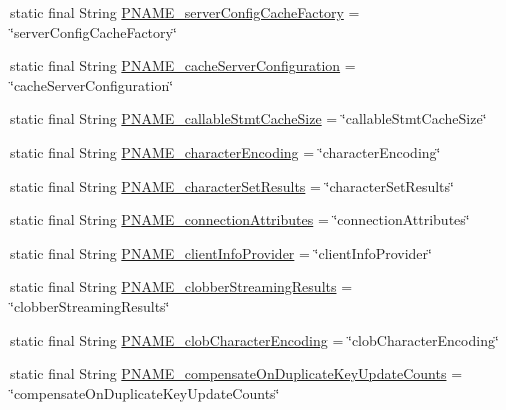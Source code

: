 \begin{DoxyCompactItemize}
\item 
static final String \mbox{\hyperlink{classcom_1_1mysql_1_1cj_1_1conf_1_1_property_definitions_abdde517ac3034e4ca1d6a8c1d4f5b247}{P\+N\+A\+M\+E\+\_\+server\+Config\+Cache\+Factory}} = \char`\"{}server\+Config\+Cache\+Factory\char`\"{}
\item 
static final String \mbox{\hyperlink{classcom_1_1mysql_1_1cj_1_1conf_1_1_property_definitions_ad55cd0e317a487dfdcac399fb3d946eb}{P\+N\+A\+M\+E\+\_\+cache\+Server\+Configuration}} = \char`\"{}cache\+Server\+Configuration\char`\"{}
\item 
static final String \mbox{\hyperlink{classcom_1_1mysql_1_1cj_1_1conf_1_1_property_definitions_a367a64bd823345bf89867ecc93e72695}{P\+N\+A\+M\+E\+\_\+callable\+Stmt\+Cache\+Size}} = \char`\"{}callable\+Stmt\+Cache\+Size\char`\"{}
\item 
static final String \mbox{\hyperlink{classcom_1_1mysql_1_1cj_1_1conf_1_1_property_definitions_a489a6767f196f3cae0dda8e14441ed0a}{P\+N\+A\+M\+E\+\_\+character\+Encoding}} = \char`\"{}character\+Encoding\char`\"{}
\item 
static final String \mbox{\hyperlink{classcom_1_1mysql_1_1cj_1_1conf_1_1_property_definitions_a856ce718c25412a9648602fa8da496b0}{P\+N\+A\+M\+E\+\_\+character\+Set\+Results}} = \char`\"{}character\+Set\+Results\char`\"{}
\item 
static final String \mbox{\hyperlink{classcom_1_1mysql_1_1cj_1_1conf_1_1_property_definitions_a9b613c0735a19f3d79caf54acf83816e}{P\+N\+A\+M\+E\+\_\+connection\+Attributes}} = \char`\"{}connection\+Attributes\char`\"{}
\item 
static final String \mbox{\hyperlink{classcom_1_1mysql_1_1cj_1_1conf_1_1_property_definitions_af9b37c508150b652d90f0f0c26068353}{P\+N\+A\+M\+E\+\_\+client\+Info\+Provider}} = \char`\"{}client\+Info\+Provider\char`\"{}
\item 
static final String \mbox{\hyperlink{classcom_1_1mysql_1_1cj_1_1conf_1_1_property_definitions_a6dfc017c3935c02a095f1148ff210b1a}{P\+N\+A\+M\+E\+\_\+clobber\+Streaming\+Results}} = \char`\"{}clobber\+Streaming\+Results\char`\"{}
\item 
static final String \mbox{\hyperlink{classcom_1_1mysql_1_1cj_1_1conf_1_1_property_definitions_ac7cf808189c5fd9eeb73532c341b856a}{P\+N\+A\+M\+E\+\_\+clob\+Character\+Encoding}} = \char`\"{}clob\+Character\+Encoding\char`\"{}
\item 
static final String \mbox{\hyperlink{classcom_1_1mysql_1_1cj_1_1conf_1_1_property_definitions_ad5cfe0b2e74bee2ebfe18b4bfba9f76a}{P\+N\+A\+M\+E\+\_\+compensate\+On\+Duplicate\+Key\+Update\+Counts}} = \char`\"{}compensate\+On\+Duplicate\+Key\+Update\+Counts\char`\"{}

\end{DoxyCompactItemize}
